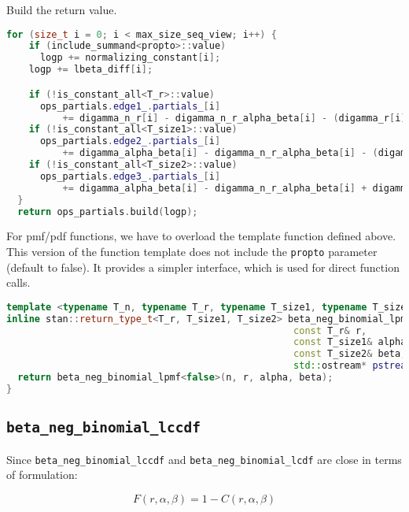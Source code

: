 \documentclass[11pt]{article}
\begin{document}
Build the return value.
\begin{lstlisting}[language=c++, style=lgeneral]
  for (size_t i = 0; i < max_size_seq_view; i++) {
    if (include_summand<propto>::value)
      logp += normalizing_constant[i];
    logp += lbeta_diff[i];

    if (!is_constant_all<T_r>::value)
      ops_partials.edge1_.partials_[i]
          += digamma_n_r[i] - digamma_n_r_alpha_beta[i] - (digamma_r[i] - digamma_r_alpha[i]);
    if (!is_constant_all<T_size1>::value)
      ops_partials.edge2_.partials_[i]
          += digamma_alpha_beta[i] - digamma_n_r_alpha_beta[i] - (digamma_alpha[i] - digamma_r_alpha[i]);
    if (!is_constant_all<T_size2>::value)
      ops_partials.edge3_.partials_[i]
          += digamma_alpha_beta[i] - digamma_n_r_alpha_beta[i] + digamma_n_beta[i] - digamma_beta[i];
  }
  return ops_partials.build(logp);
\end{lstlisting}


For pmf/pdf functions, we have to overload the template function defined above. This version of the function template does not include the \verb|propto| parameter (default to false). It provides a simpler interface, which is used for direct function calls.

\begin{lstlisting}[language=c++, style=lgeneral]
template <typename T_n, typename T_r, typename T_size1, typename T_size2>
inline stan::return_type_t<T_r, T_size1, T_size2> beta_neg_binomial_lpmf(const T_n& n, 
                                                   const T_r& r,
                                                   const T_size1& alpha,
                                                   const T_size2& beta,
                                                   std::ostream* pstream__) {
  return beta_neg_binomial_lpmf<false>(n, r, alpha, beta);
}
\end{lstlisting}



\cprotect\subsection{\verb|beta_neg_binomial_lccdf|}

Since \verb|beta_neg_binomial_lccdf| and \verb|beta_neg_binomial_lcdf| are close in terms of formulation:

\begin{equation}
	F(r,\alpha,\beta) = 1 - C(r,\alpha,\beta)
\end{equation}
\end{document}
